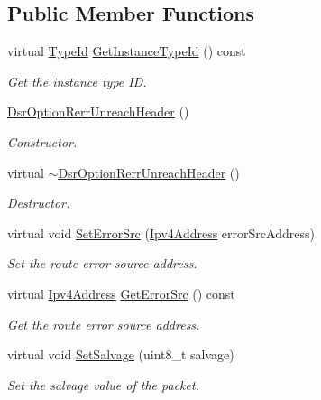 \subsection*{Public Member Functions}
\begin{DoxyCompactItemize}
\item 
virtual \hyperlink{classns3_1_1TypeId}{Type\+Id} \hyperlink{classns3_1_1dsr_1_1DsrOptionRerrUnreachHeader_a74c39277b2aec5256bc5374ecd4536a3}{Get\+Instance\+Type\+Id} () const 
\begin{DoxyCompactList}\small\item\em Get the instance type ID. \end{DoxyCompactList}\item 
\hyperlink{classns3_1_1dsr_1_1DsrOptionRerrUnreachHeader_a674e3f1de75eda232b074036435d5f53}{Dsr\+Option\+Rerr\+Unreach\+Header} ()
\begin{DoxyCompactList}\small\item\em Constructor. \end{DoxyCompactList}\item 
virtual \hyperlink{classns3_1_1dsr_1_1DsrOptionRerrUnreachHeader_a7a2ca08bb978cbc7f5c581108ce91c8d}{$\sim$\+Dsr\+Option\+Rerr\+Unreach\+Header} ()
\begin{DoxyCompactList}\small\item\em Destructor. \end{DoxyCompactList}\item 
virtual void \hyperlink{classns3_1_1dsr_1_1DsrOptionRerrUnreachHeader_a0d7151da0f101bea94a9c352a7b7174a}{Set\+Error\+Src} (\hyperlink{classns3_1_1Ipv4Address}{Ipv4\+Address} error\+Src\+Address)
\begin{DoxyCompactList}\small\item\em Set the route error source address. \end{DoxyCompactList}\item 
virtual \hyperlink{classns3_1_1Ipv4Address}{Ipv4\+Address} \hyperlink{classns3_1_1dsr_1_1DsrOptionRerrUnreachHeader_af20fee94c77b871730fae3e29b4a0f4a}{Get\+Error\+Src} () const 
\begin{DoxyCompactList}\small\item\em Get the route error source address. \end{DoxyCompactList}\item 
virtual void \hyperlink{classns3_1_1dsr_1_1DsrOptionRerrUnreachHeader_aa7dd64d6de9c3c474813cbe484e9d773}{Set\+Salvage} (uint8\+\_\+t salvage)
\begin{DoxyCompactList}\small\item\em Set the salvage value of the packet. \end{DoxyCompactList}\item 

\end{DoxyCompactItemize}
